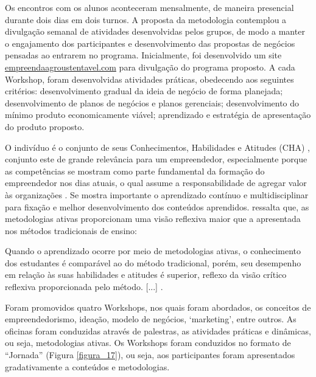 Os encontros com os alunos aconteceram mensalmente, de maneira presencial durante dois dias em dois turnos. A proposta da metodologia contemplou a divulgação semanal de atividades desenvolvidas pelos grupos, de modo a manter o engajamento dos participantes e desenvolvimento das propostas de negócios pensadas ao entrarem no programa. Inicialmente, foi desenvolvido um site \href{http://www.empreendaagrosustentavel.com}{empreendaagroustentavel.com} para divulgação do programa proposto. A cada Workshop, foram desenvolvidas atividades práticas, obedecendo aos seguintes critérios: desenvolvimento gradual da ideia de negócio de forma planejada; desenvolvimento de planos de negócios e planos gerenciais; desenvolvimento do mínimo produto economicamente viável; aprendizado e estratégia de apresentação do produto proposto.

O indivíduo é o conjunto de seus Conhecimentos, Habilidades e Atitudes (CHA) \cite{dutra_competencias_2004}, conjunto este de grande relevância para um empreendedor, especialmente porque as competências se mostram como parte fundamental da formação do empreendedor nos dias atuais, o qual assume a responsabilidade de agregar valor às organizações \cite{ferreira_conhecimento_2019}. Se mostra importante o aprendizado contínuo e multidisciplinar para fixação e melhor desenvolvimento dos conteúdos aprendidos.  ressalta que, as metodologias ativas proporcionam uma visão reflexiva maior que a apresentada nos métodos tradicionais de ensino:

\begin{citacao}
[...] Quando o aprendizado ocorre por meio de metodologias ativas, o conhecimento dos estudantes é comparável ao do método tradicional, porém, seu desempenho em relação às suas habilidades e atitudes é superior, reflexo da visão crítico reflexiva proporcionada pelo método. [...] \cite{limberger_metodologias_2013}.
\end{citacao}


Foram promovidos quatro Workshops, nos quais foram abordados, os conceitos de empreendedorismo, ideação, modelo de negócios, ‘marketing’, entre outros. As oficinas foram conduzidas através de palestras, as atividades práticas e dinâmicas, ou seja, metodologias ativas. Os Workshops foram conduzidos no formato de “Jornada” (Figura \ref{figura_17}), ou seja, aos participantes foram apresentados gradativamente a conteúdos e metodologias.

